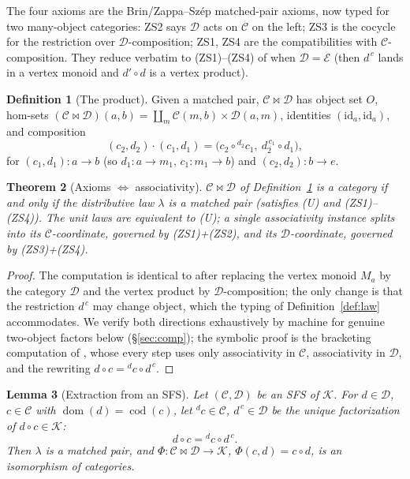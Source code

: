 \documentclass[11pt]{article}
\newtheorem{theorem}{Theorem}
\newtheorem{lemma}[theorem]{Lemma}
\theoremstyle{definition}
\newtheorem{definition}[theorem]{Definition}
\newcommand{\id}{\mathrm{id}}
\newcommand{\C}{\mathcal{C}}
\newcommand{\D}{\mathcal{D}}
\newcommand{\K}{\mathcal{K}}
\newcommand{\E}{\mathcal{E}}
\newcommand{\dom}{\operatorname{dom}}
\newcommand{\cod}{\operatorname{cod}}
\newcommand{\lact}[2]{{}^{#1}\!#2}      %
\newcommand{\rest}[2]{#1^{\,#2}}        %
\begin{document}
The four axioms are the Brin/Zappa--Sz\'ep matched-pair axioms, now typed for two
many-object categories: ZS2 says $\D$ acts on $\C$ on the left; ZS3 is the cocycle
for the restriction over $\D$-composition; ZS1, ZS4 are the compatibilities with
$\C$-composition. They reduce verbatim to (ZS1)--(ZS4) of \cite{single} when
$\D=\E$ (then $\rest{d}{c}$ lands in a vertex monoid and $d'\circ d$ is a vertex
product).

\begin{definition}[The product]\label{def:prod}
Given a matched pair, $\C\bowtie\D$ has object set $O$, hom-sets
$(\C\bowtie\D)(a,b)=\coprod_{m}\C(m,b)\times\D(a,m)$, identities
$(\id_a,\id_a)$, and composition
\[
  (c_2,d_2)\cdot(c_1,d_1)
  =\bigl(c_2\circ\lact{d_2}{c_1},\ \rest{d_2}{c_1}\circ d_1\bigr),
\]
for $(c_1,d_1):a\to b$ (so $d_1:a\to m_1$, $c_1:m_1\to b$) and $(c_2,d_2):b\to e$.
\end{definition}

\begin{theorem}[Axioms $\iff$ associativity]\label{thm:axioms}
$\C\bowtie\D$ of Definition~\ref{def:prod} is a category if and only if the
distributive law $\lambda$ is a matched pair (satisfies \textnormal{(U)} and
\textnormal{(ZS1)--(ZS4)}). The unit laws are equivalent to \textnormal{(U)}; a
single associativity instance splits into its $\C$-coordinate, governed by
\textnormal{(ZS1)+(ZS2)}, and its $\D$-coordinate, governed by
\textnormal{(ZS3)+(ZS4)}.
\end{theorem}

\begin{proof}
The computation is identical to \cite[Thm.~3]{single} after replacing the vertex
monoid $M_a$ by the category $\D$ and the vertex product by $\D$-composition; the
only change is that the restriction $\rest{d}{c}$ may change object, which the
typing of Definition~\ref{def:law} accommodates. We verify both directions
exhaustively by machine for genuine two-object factors below
(\S\ref{sec:comp}); the symbolic proof is the bracketing computation of
\cite{single}, whose every step uses only associativity in $\C$, associativity in
$\D$, and the rewriting $d\circ c=\lact{d}{c}\circ\rest{d}{c}$.
\end{proof}

\begin{lemma}[Extraction from an SFS]\label{lem:extract}
Let $(\C,\D)$ be an SFS of $\K$. For $d\in\D$, $c\in\C$ with $\dom(d)=\cod(c)$,
let $\lact{d}{c}\in\C$, $\rest{d}{c}\in\D$ be the unique factorization of
$d\circ c\in\K$:
\[
  d\circ c=\lact{d}{c}\circ\rest{d}{c}.
\]
Then $\lambda$ is a matched pair, and $\Phi:\C\bowtie\D\to\K$,
$\Phi(c,d)=c\circ d$, is an isomorphism of categories.
\end{lemma}
\end{document}
